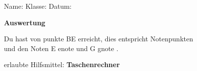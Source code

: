\documentclass[fleqn,leqno,12pt]{scrartcl} %
\theoremstyle{note}
\begin{document}
\begin{flushleft}
Name:\underline{\hspace{8cm}} \qquad
Klasse:\underline{\hspace{1.5cm}} \qquad
Datum:\underline{\hspace{2.5cm}}
\begin{framed}
\begin{center}
{\bf Auswertung}
\end{center}
Du hast \underline{\qquad} von {{ punkte }} BE erreicht, dies entspricht \underline{\qquad} Notenpunkten \\
und den Noten E {{ enote }} und G {{ gnote }}.
\end{framed}

\begin{center}
erlaubte Hilfsmittel: {\bf Taschenrechner}
\end{center}


\end{flushleft}
\end{document}
